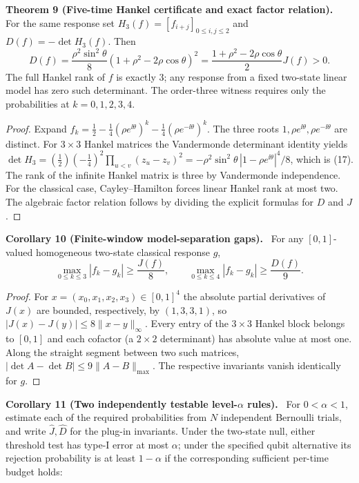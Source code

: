 \documentclass[11pt,a4paper,oneside]{book}
\newcommand{\statement}[3]{\par\medskip\noindent\textbf{#1 #2 (#3).}\ }
\begin{document}
\statement{Theorem}{9}{Five-time Hankel certificate and exact factor relation} For the same response set $H_3(f)=[f_{i+j}]_{0\le i,j\le2}$ and $D(f)=-\det H_3(f)$. Then
\begin{equation}D(f)=\frac{\rho^2\sin^2\theta}{8}(1+\rho^2-2\rho\cos\theta)^2=\frac{1+\rho^2-2\rho\cos\theta}{2}J(f)>0.\tag{17}\end{equation}
The full Hankel rank of $f$ is exactly $3$; any response from a fixed two-state linear model has zero such determinant. The order-three witness requires only the probabilities at $k=0,1,2,3,4$.
\begin{proof}Expand $f_k=\frac12-\frac14(\rho e^{\ii\theta})^k-\frac14(\rho e^{-\ii\theta})^k$. The three roots $1,\rho e^{\ii\theta},\rho e^{-\ii\theta}$ are distinct. For $3\times3$ Hankel matrices the Vandermonde determinant identity yields $\det H_3=(\frac12)(-\frac14)^2\prod_{u<v}(z_u-z_v)^2=-\rho^2\sin^2\theta\,|1-\rho e^{\ii\theta}|^4/8$, which is (17). The rank of the infinite Hankel matrix is three by Vandermonde independence. For the classical case, Cayley--Hamilton forces linear Hankel rank at most two. The algebraic factor relation follows by dividing the explicit formulas for $D$ and $J$.\end{proof}
\statement{Corollary}{10}{Finite-window model-separation gaps} For any $[0,1]$-valued homogeneous two-state classical response $g$,
\begin{equation}\max_{0\le k\le3}|f_k-g_k|\ge\frac{J(f)}8,\qquad\max_{0\le k\le4}|f_k-g_k|\ge\frac{D(f)}9.\tag{18}\end{equation}
\begin{proof}For $x=(x_0,x_1,x_2,x_3)\in[0,1]^4$ the absolute partial derivatives of $J(x)$ are bounded, respectively, by $(1,3,3,1)$, so $|J(x)-J(y)|\le8\|x-y\|_\infty$. Every entry of the $3\times3$ Hankel block belongs to $[0,1]$ and each cofactor (a $2\times2$ determinant) has absolute value at most one. Along the straight segment between two such matrices, $|\det A-\det B|\le9\|A-B\|_{\max}$. The respective invariants vanish identically for $g$.\end{proof}
\statement{Corollary}{11}{Two independently testable level-$\alpha$ rules} For $0<\alpha<1$, estimate each of the required probabilities from $N$ independent Bernoulli trials, and write $\widehat J,\widehat D$ for the plug-in invariants. Under the two-state null, either threshold test has type-I error at most $\alpha$; under the specified qubit alternative its rejection probability is at least $1-\alpha$ if the corresponding sufficient per-time budget holds:
\end{document}
